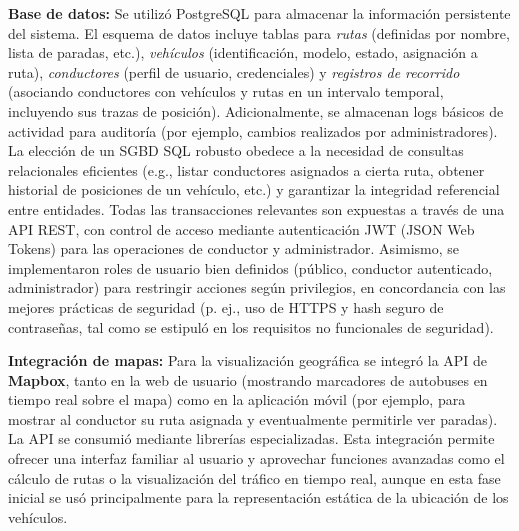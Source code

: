 \textbf{Base de datos:} Se utilizó PostgreSQL para almacenar la información persistente del sistema. El esquema de datos incluye tablas para \emph{rutas} (definidas por nombre, lista de paradas, etc.), \emph{vehículos} (identificación, modelo, estado, asignación a ruta), \emph{conductores} (perfil de usuario, credenciales) y \emph{registros de recorrido} (asociando conductores con vehículos y rutas en un intervalo temporal, incluyendo sus trazas de posición). Adicionalmente, se almacenan logs básicos de actividad para auditoría (por ejemplo, cambios realizados por administradores). La elección de un SGBD SQL robusto obedece a la necesidad de consultas relacionales eficientes (e.g., listar conductores asignados a cierta ruta, obtener historial de posiciones de un vehículo, etc.) y garantizar la integridad referencial entre entidades. Todas las transacciones relevantes son expuestas a través de una API REST, con control de acceso mediante autenticación JWT (JSON Web Tokens) para las operaciones de conductor y administrador. Asimismo, se implementaron roles de usuario bien definidos (público, conductor autenticado, administrador) para restringir acciones según privilegios, en concordancia con las mejores prácticas de seguridad (p. ej., uso de HTTPS y hash seguro de contraseñas, tal como se estipuló en los requisitos no funcionales de seguridad).

\textbf{Integración de mapas:} Para la visualización geográfica se integró la API de \textbf{Mapbox}, tanto en la web de usuario (mostrando marcadores de autobuses en tiempo real sobre el mapa) como en la aplicación móvil (por ejemplo, para mostrar al conductor su ruta asignada y eventualmente permitirle ver paradas). La API se consumió mediante librerías especializadas. Esta integración permite ofrecer una interfaz familiar al usuario y aprovechar funciones avanzadas como el cálculo de rutas o la visualización del tráfico en tiempo real, aunque en esta fase inicial se usó principalmente para la representación estática de la ubicación de los vehículos.
